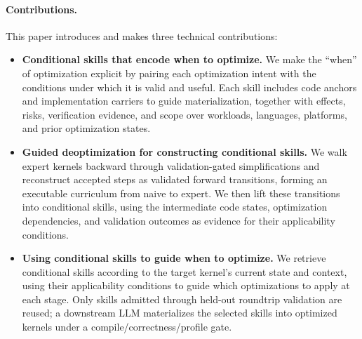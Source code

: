 \paragraph{Contributions.}
This paper introduces \sys{} and makes three technical contributions:
\begin{itemize}
    \item \textbf{Conditional skills that encode when to optimize.} We make the ``when'' of optimization explicit by pairing each optimization intent with the conditions under which it is valid and useful. Each skill includes code anchors and implementation carriers to guide materialization, together with effects, risks, verification evidence, and scope over workloads, languages, platforms, and prior optimization states.

    \item \textbf{Guided deoptimization for constructing conditional skills.} We walk expert kernels backward through validation-gated simplifications and reconstruct accepted steps as validated forward transitions, forming an executable curriculum from naive to expert. We then lift these transitions into conditional skills, using the intermediate code states, optimization dependencies, and validation outcomes as evidence for their applicability conditions.

    \item \textbf{Using conditional skills to guide when to optimize.} We retrieve conditional skills according to the target kernel's current state and context, using their applicability conditions to guide which optimizations to apply at each stage. Only skills admitted through held-out roundtrip validation are reused; a downstream LLM materializes the selected skills into optimized kernels under a compile/correctness/profile gate.
\end{itemize}
